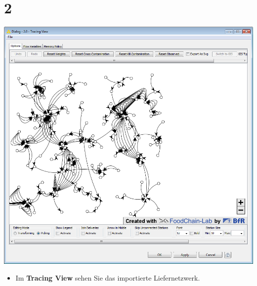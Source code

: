 \documentclass{beamer}
\begin{document}
\section{2}
\begin{frame}
	\begin{center}
  		\includegraphics[height=0.6\textheight]{2.png}
	\end{center}
	\begin{itemize}
		\item Im \textbf{Tracing View} sehen Sie das importierte Liefernetzwerk.
	\end{itemize}
\end{frame}
\end{document}
